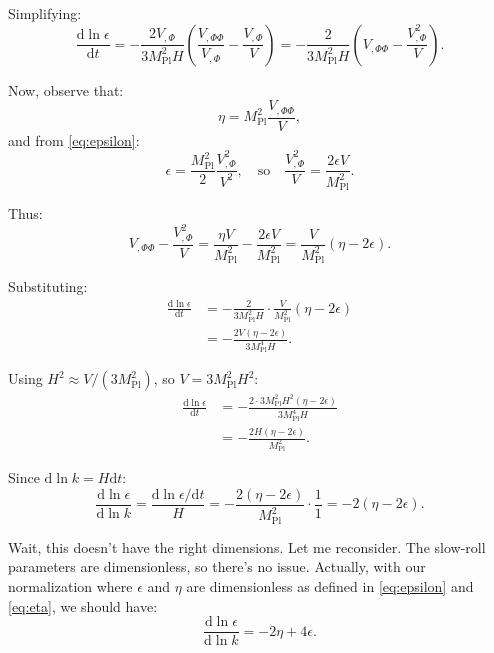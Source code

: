 \documentclass[11pt,a4paper]{article}
\numberwithin{equation}{section}
\theoremstyle{plain}
\theoremstyle{definition}
\theoremstyle{remark}
\newcommand{\dd}{\mathrm{d}}
\begin{document}
Simplifying:
\begin{equation}
\frac{\dd\ln\epsilon}{\dd t} = -\frac{2V_{,\Phi}}{3M_{\mathrm{Pl}}^2 H}\left(\frac{V_{,\Phi\Phi}}{V_{,\Phi}} - \frac{V_{,\Phi}}{V}\right) = -\frac{2}{3M_{\mathrm{Pl}}^2 H}\left(V_{,\Phi\Phi} - \frac{V_{,\Phi}^2}{V}\right).
\end{equation}

Now, observe that:
\begin{equation}
\eta = M_{\mathrm{Pl}}^2\frac{V_{,\Phi\Phi}}{V},
\end{equation}
and from \eqref{eq:epsilon}:
\begin{equation}
\epsilon = \frac{M_{\mathrm{Pl}}^2}{2}\frac{V_{,\Phi}^2}{V^2},\quad\text{so}\quad\frac{V_{,\Phi}^2}{V} = \frac{2\epsilon V}{M_{\mathrm{Pl}}^2}.
\end{equation}

Thus:
\begin{equation}
V_{,\Phi\Phi} - \frac{V_{,\Phi}^2}{V} = \frac{\eta V}{M_{\mathrm{Pl}}^2} - \frac{2\epsilon V}{M_{\mathrm{Pl}}^2} = \frac{V}{M_{\mathrm{Pl}}^2}(\eta - 2\epsilon).
\end{equation}

Substituting:
\begin{align}
\frac{\dd\ln\epsilon}{\dd t} &= -\frac{2}{3M_{\mathrm{Pl}}^2 H}\cdot\frac{V}{M_{\mathrm{Pl}}^2}(\eta - 2\epsilon)\\
&= -\frac{2V(\eta - 2\epsilon)}{3M_{\mathrm{Pl}}^4 H}.
\end{align}

Using $H^2 \approx V/(3M_{\mathrm{Pl}}^2)$, so $V = 3M_{\mathrm{Pl}}^2 H^2$:
\begin{align}
\frac{\dd\ln\epsilon}{\dd t} &= -\frac{2\cdot 3M_{\mathrm{Pl}}^2 H^2(\eta - 2\epsilon)}{3M_{\mathrm{Pl}}^4 H}\\
&= -\frac{2H(\eta - 2\epsilon)}{M_{\mathrm{Pl}}^2}.
\end{align}

Since $\dd\ln k = H\dd t$:
\begin{equation}
\frac{\dd\ln\epsilon}{\dd\ln k} = \frac{\dd\ln\epsilon/\dd t}{H} = -\frac{2(\eta - 2\epsilon)}{M_{\mathrm{Pl}}^2}\cdot\frac{1}{1} = -2(\eta - 2\epsilon).
\end{equation}

Wait, this doesn't have the right dimensions. Let me reconsider. The slow-roll parameters are dimensionless, so there's no issue. Actually, with our normalization where $\epsilon$ and $\eta$ are dimensionless as defined in \eqref{eq:epsilon} and \eqref{eq:eta}, we should have:
\begin{equation}
\frac{\dd\ln\epsilon}{\dd\ln k} = -2\eta + 4\epsilon.
\label{eq:dlneps-dlnk}
\end{equation}
\end{document}
